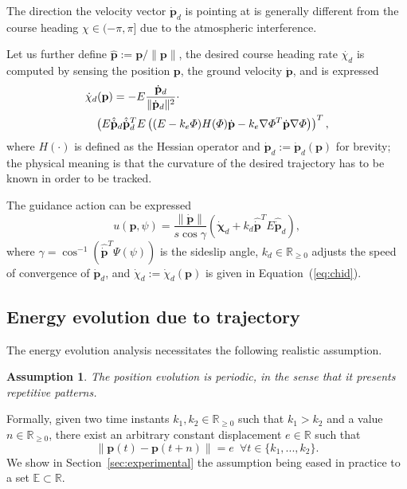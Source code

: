 \documentclass[letterpaper,10pt,conference]{ieeeconf}
\newtheorem{assm}[thm]{Assumption}
\begin{document}
The direction the velocity vector $\dot{\mathbf{p}}_d$ is pointing at is generally different from the course heading $\chi\in(-\pi,\pi]$ due to the atmospheric interference.

Let us further define $\hat{\mathbf{p}}:=\mathbf{p}/\|\mathbf{p}\|$, the desired course heading rate $\dot{\chi_d}$ is computed by sensing the position $\mathbf{p}$, the ground velocity $\dot{\mathbf{p}}$, and is expressed
\begin{equation}\label{eq:chid}\begin{split}
  &\dot{\chi}_d(\mathbf{p})=-E\frac{\dot{\mathbf{p}}_d}{\|\dot{\mathbf{p}}_d\|^2}\cdot\\
  &\hspace{2ex}\left( E\hat{\dot{\mathbf{p}}}_d\hat{\dot{\mathbf{p}}}_d^TE\left( (E-k_e\varPhi)H(\varPhi)\dot{\mathbf{p}}-k_e\nabla\varPhi^T\dot{\mathbf{p}}\nabla\varPhi \right) \right)^T,
\end{split}
\end{equation} 
where $H(\cdot)$ is defined as the Hessian operator and $\dot{\mathbf{p}}_d:=\dot{\mathbf{p}}_d(\mathbf{p})$ for brevity; the physical meaning is that the curvature of the desired trajectory has to be known in order to be tracked.

The guidance action can be expressed
\begin{equation}\label{eq:uav-cont}
  u(\mathbf{p},\psi)=\frac{\|\dot{\mathbf{p}}\|}{s\cos{\gamma}}\left( \dot{\mathbf{\chi}}_d+k_d\hat{\dot{\mathbf{p}}}^TE\hat{\dot{\mathbf{p}}}_d \right),
\end{equation} 
where $\gamma=\cos^{-1}{\left( \hat{\dot{\mathbf{p}}}^T\Psi(\psi) \right)}$ is the sideslip angle, $k_d\in\mathbb{R}_{\geq 0}$ adjusts the speed of convergence of $\dot{\mathbf{p}}_d$, and $\dot{\chi}_d:=\dot{\chi}_d(\mathbf{p})$ is given in Equation~(\ref{eq:chid}).

\subsection{Energy evolution due to trajectory}
\label{sec:energy-model}

The energy evolution analysis necessitates the following realistic assumption.
\begin{assm}\label{assm:periodic} The position evolution is periodic, in the sense that it presents repetitive patterns.
\end{assm}
Formally, given two time instants $k_1,k_2\in\mathbb{R}_{\geq 0}$ such that $k_1>k_2$ and a value $n\in\mathbb{R}_{\geq 0}$, there exist an arbitrary constant displacement $e\in\mathbb{R}$ such that
\begin{equation}
  \|\mathbf{p}(t)-\mathbf{p}(t+n)\|= e\,\,\,\forall t\in\{k_1,...,k_2\}.
\end{equation}
We show in Section~\ref{sec:experimental} the assumption being eased in practice to a set $\mathbb{E}\subset\mathbb{R}$.
\end{document}
